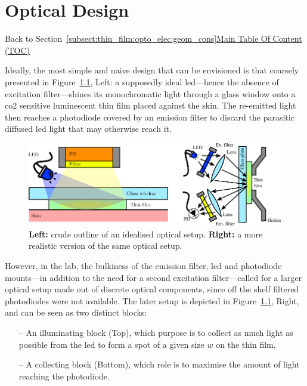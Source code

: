 \chapter{Optical Design}\label{app:optical_design}

\begin{appbox}
	Back to Section~\ref{subsect:thin_film:opto_elec:geom_cons}\hfill \hyperref[chapter:toc]{Main Table Of Content (TOC)}
\end{appbox}

Ideally, the most simple and naive design that can be envisioned is that coarsely presented in Figure~\ref{annfig:optics:outline}, Left: a supposedly ideal \gls{led}---hence the absence of excitation filter---shines its monochromatic light through a glass window onto a \gls{co2} sensitive luminescent thin film placed against the skin. The re-emitted light then reaches a photodiode covered by an emission filter to discard the parasitic diffused \gls{led} light that may otherwise reach it.

\begin{figure}
	\centering
	\includegraphics{2_appendices/optical_figures/naive_outline.pdf}
	\caption[Idealised and realistic optical setups.]{\textbf{Left:} crude outline of an idealised optical setup. \textbf{Right:} a more realistic version of the same optical setup.}
	\label{annfig:optics:outline}
\end{figure}

However, in the lab, the bulkiness of the emission filter, \gls{led} and photodiode mounts---in addition to the need for a second excitation filter---called for a larger optical setup made out of discrete optical components, since off the shelf filtered photodiodes were not available. The later setup is depicted in Figure~\ref{annfig:optics:outline}, Right, and can be seen as two distinct blocks:
\begin{itemize}
	\item[--] An illuminating block (Top), which purpose is to collect as much light as possible from the \gls{led} to form a spot of a given size $w$ on the thin film.
	\item[--] A collecting block (Bottom), which role is to maximise the amount of light 
	reaching the photodiode.
\end{itemize}

